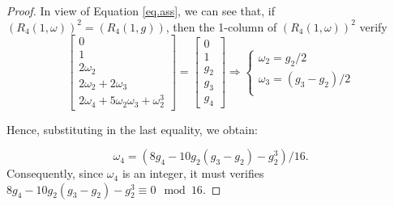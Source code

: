 \documentclass[preprint,12pt]{elsarticle}
\begin{document}
\begin{proof} 
\noindent In view of Equation \eqref{eq.ass},  we can see that, if  $(R_4(1,\omega))^2 = (R_4(1,g))$, then the 1-column of $(R_4(1,\omega))^2$ verify
$$\begin{bmatrix}0 \\ 1 \\ 2\omega_2\\ 2\omega_2+2\omega_3\\ 2\omega_4+5\omega_2\omega_3+\omega_2^3 \end{bmatrix} = \begin{bmatrix}
0 \\ 
1 \\ g_2\\g_3\\ g_4 \end{bmatrix} \Rightarrow \begin{cases}
    \omega_2 = g_2 / 2 \\
    \omega_3=(g_3-g_2)/2 \\
\end{cases} $$

Hence, substituting in the last equality, we obtain:

$$
\omega_4=(8g_4-10g_2(g_3-g_2)-g_2^3)/16.
$$
Consequently, since $\omega_4$ is an integer, it must verifies $8g_4-10g_2(g_3-g_2)-g_2^3\equiv 0\mod 16$.
\end{proof}





\end{document}
